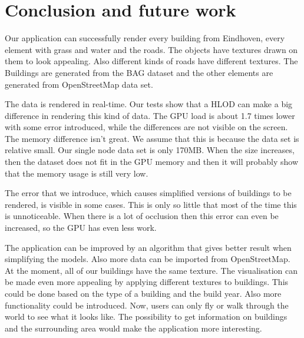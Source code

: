 \chapter{Conclusion and future work}
Our application can successfully render every building from Eindhoven, every element with grass and water and the roads. The objects have textures drawn on them to look appealing. Also different kinds of roads have different textures. The Buildings are generated from the BAG dataset and the other elements are generated from OpenStreetMap data set.

The data is rendered in real-time. Our tests show that a HLOD can make a big difference in rendering this kind of data. The GPU load is about 1.7 times lower with some error introduced, while the differences are not visible on the screen. The memory difference isn’t great. We assume that this is because the data set is relative small. Our single node data set is only 170MB. When the size increases, then the dataset does not fit in the GPU memory and then it will probably show that the memory usage is still very low.

The error that we introduce, which causes simplified versions of buildings to be rendered, is visible in some cases. This is only so little that most of the time this is unnoticeable. When there is a lot of occlusion then this error can even be increased, so the GPU has even less work.

The application can be improved by an algorithm that gives better result when simplifying the models. Also more data can be imported from OpenStreetMap. At the moment, all of our buildings have the same texture. The visualisation can be made even more appealing by applying different textures to buildings. This could be done based on the type of a building and the build year. Also more functionality could be introduced. Now, users can only fly or walk through the world to see what it looks like. The possibility to get information on buildings and the surrounding area would make the application more interesting.
